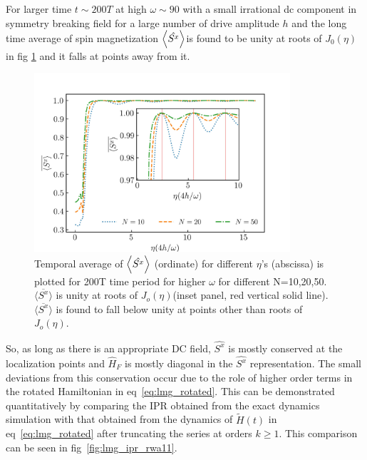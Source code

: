 \documentclass[%
reprint,
superscriptaddress,
amsmath,amssymb,
aps,
prb,
showkeys,
]{revtex4-2}
\begin{document}
	For larger time $t\sim 200 T$ at high $\omega \sim 90$ with a small irrational dc component in symmetry breaking field for a large number of drive amplitude $h$ and the long time average of spin magnetization $\expval{\hat{S^x}}$is found to be unity at roots of $J_0(\eta)$ in fig \ref{fig:sx_conserve} and it falls at points away from it. 
	\begin{figure}[t!]
		\centering
		\includegraphics[width =9.5cm]{sx_conservation.jpeg }
		\caption{Temporal average of $\expval{\hat{S^x}}$ (ordinate) for different $\eta$'s (abscissa) is plotted for 200T time period for higher $\omega$ for different N=10,20,50. $\overline{\langle S^x \rangle}$ is unity at roots of $J_o(\eta)$(inset panel, red vertical solid line). $\overline{\langle S^x \rangle}$ is found to fall below unity at points other than roots of $J_o(\eta)$.}
		\label{fig:sx_conserve}
	\end{figure}
	So, as long as there is an appropriate DC field, $\hat{S^x}$ is mostly conserved at the localization points and $\hat{H}_F$ is mostly diagonal in the $\hat{S^x}$ representation. The small deviations from this conservation occur due to the role of  higher order terms in the rotated Hamiltonian in eq~\ref{eq:lmg_rotated}. This can be demonstrated quantitatively by comparing the IPR obtained from the exact dynamics simulation with that obtained from the dynamics of $\tilde{H}(t)$ in eq~\ref{eq:lmg_rotated} after truncating the series at orders $k\geq 1$. This comparison can be seen in fig~\ref{fig:lmg_ipr_rwa11}.
\end{document}
